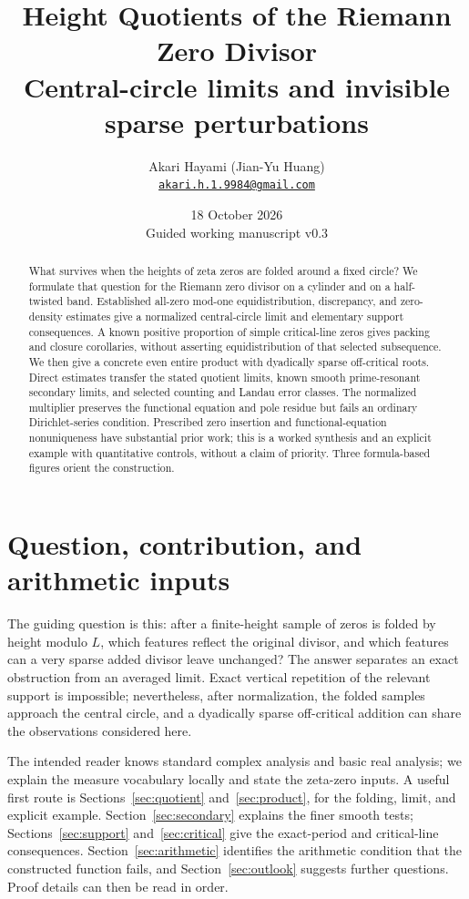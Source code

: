 \documentclass[11pt,a4paper]{article}
\title{Height Quotients of the Riemann Zero Divisor\\[3pt]
\large Central-circle limits and invisible sparse perturbations}
\author{Akari Hayami (Jian-Yu Huang)\\[3pt]
\small\href{mailto:akari.h.1.9984@gmail.com}{\texttt{akari.h.1.9984@gmail.com}}}
\date{18 October 2026\\[2pt]\small Guided working manuscript v0.3}
\theoremstyle{definition}
\theoremstyle{remark}
\begin{document}
\maketitle
\begin{abstract}
What survives when the heights of zeta zeros are folded around a fixed
circle?  We formulate that question for the Riemann zero divisor on a
cylinder and on a half-twisted band. Established all-zero mod-one
equidistribution, discrepancy, and zero-density estimates give a normalized
central-circle limit and elementary support consequences. A known positive
proportion of simple critical-line zeros gives packing and closure
corollaries, without asserting equidistribution of that selected subsequence.
We then give a concrete even entire product with dyadically sparse
off-critical roots. Direct estimates transfer the stated quotient limits,
known smooth prime-resonant secondary limits, and selected counting and
Landau error classes. The normalized multiplier preserves the functional
equation and pole residue but fails an ordinary Dirichlet-series condition.
Prescribed zero insertion and functional-equation nonuniqueness have
substantial prior work; this is a worked synthesis and an explicit example
with quantitative controls, without a claim of priority. Three formula-based
figures orient the construction.
\end{abstract}

\section{Question, contribution, and arithmetic inputs}

The guiding question is this: after a finite-height sample of
zeros is folded by height modulo $L$, which features reflect the original
divisor, and which features can a very sparse added divisor leave unchanged?
The answer separates an exact obstruction from an averaged limit. Exact
vertical repetition of the relevant support is impossible; nevertheless,
after normalization, the folded samples approach the central circle, and a
dyadically sparse off-critical addition can share the observations considered
here.

The intended reader knows standard complex analysis and basic real analysis;
we explain the measure vocabulary locally and state the zeta-zero inputs.
A useful first route is Sections~\ref{sec:quotient} and~\ref{sec:product},
for the folding, limit, and explicit example. Section~\ref{sec:secondary}
explains the finer smooth tests; Sections~\ref{sec:support}
and~\ref{sec:critical} give the exact-period and critical-line consequences.
Section~\ref{sec:arithmetic} identifies the arithmetic condition that the
constructed function fails, and Section~\ref{sec:outlook} suggests further
questions. Proof details can then be read in order.
\end{document}
